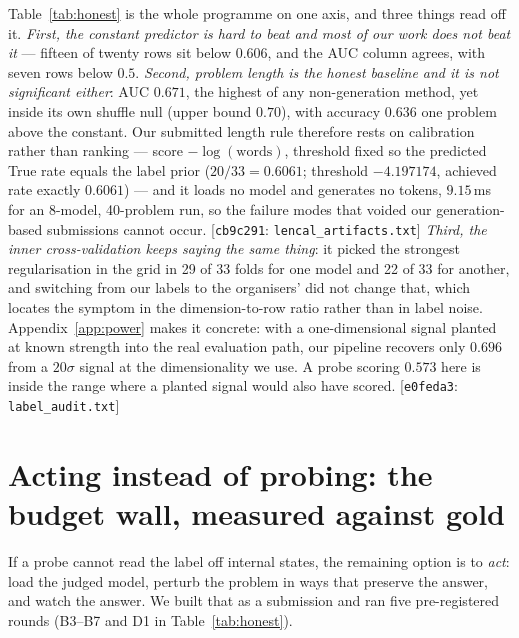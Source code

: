 \documentclass[10pt]{article}
\newcommand{\cmt}[2]{{\footnotesize\textsf{[}\texttt{#1}\textsf{:} #2\textsf{]}}}
\begin{document}
Table~\ref{tab:honest} is the whole programme on one axis, and three things read off it.
\emph{First, the constant predictor is hard to beat and most of our work does not beat it} ---
fifteen of twenty rows sit below $0.606$, and the AUC column agrees, with seven rows below $0.5$.
\emph{Second, problem length is the honest baseline and it is not significant either}: AUC $0.671$,
the highest of any non-generation method, yet inside its own shuffle null (upper bound $0.70$), with
accuracy $0.636$ one problem above the constant. Our submitted length rule therefore rests on
calibration rather than ranking --- score $-\log(\text{words})$, threshold fixed so the predicted
True rate equals the label prior ($20/33 = 0.6061$; threshold $-4.197174$, achieved rate exactly
$0.6061$) --- and it loads no model and generates no tokens, $9.15$\,ms for an 8-model, 40-problem
run, so the failure modes that voided our generation-based submissions cannot occur.
\cmt{cb9c291}{\texttt{lencal\_artifacts.txt}}
\emph{Third, the inner cross-validation keeps saying the same thing}: it picked the strongest
regularisation in the grid in 29 of 33 folds for one model and 22 of 33 for another, and switching
from our labels to the organisers' did not change that, which locates the symptom in the
dimension-to-row ratio rather than in label noise. Appendix~\ref{app:power} makes it concrete: with
a one-dimensional signal planted at known strength into the real evaluation path, our pipeline
recovers only $0.696$ from a $20\sigma$ signal at the dimensionality we use. A probe scoring $0.573$
here is inside the range where a planted signal would also have scored.
\cmt{e0feda3}{\texttt{label\_audit.txt}}

\section{Acting instead of probing: the budget wall, measured against gold}
\label{sec:acting}
If a probe cannot read the label off internal states, the remaining option is to \emph{act}: load the
judged model, perturb the problem in ways that preserve the answer, and watch the answer. We built
that as a submission and ran five pre-registered rounds (B3--B7 and D1 in Table~\ref{tab:honest}).
\end{document}
